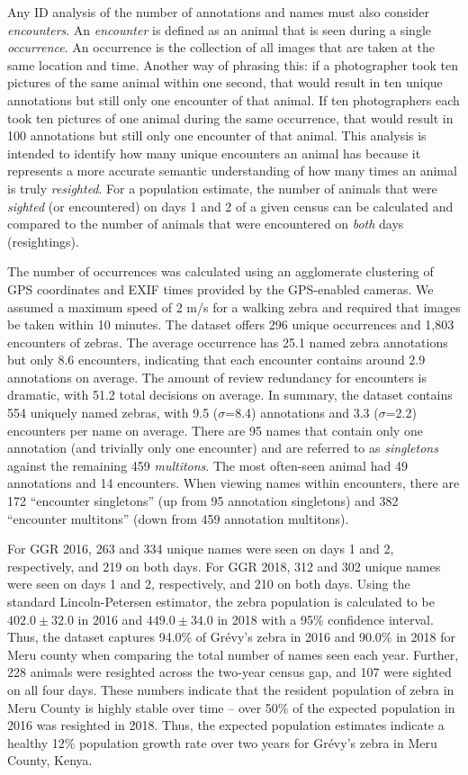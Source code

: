 Any ID analysis of the number of annotations and names must also consider \textit{encounters}.  An \textit{encounter} is defined as an animal that is seen during a single \textit{occurrence}.  An occurrence is the collection of all images that are taken at the same location and time.  Another way of phrasing this: if a photographer took ten pictures of the same animal within one second, that would result in ten unique annotations but still only one encounter of that animal.  If ten photographers each took ten pictures of one animal during the same occurrence, that would result in 100 annotations but still only one encounter of that animal.  This analysis is intended to identify how many unique encounters an animal has because it represents a more accurate semantic understanding of how many times an animal is truly \textit{resighted}.  For a population estimate, the number of animals that were \textit{sighted} (or encountered) on days 1 and 2 of a given census can be calculated and compared to the number of animals that were encountered on \textit{both} days (resightings).

The number of occurrences was calculated using an agglomerate clustering of GPS coordinates and EXIF times provided by the GPS-enabled cameras.  We assumed a maximum speed of 2 m/s for a walking zebra and required that images be taken within 10 minutes.  The dataset offers 296 unique occurrences and 1,803 encounters of zebras.  The average occurrence has 25.1 named zebra annotations but only 8.6 encounters, indicating that each encounter contains around 2.9 annotations on average.  The amount of review redundancy for encounters is dramatic, with 51.2 total decisions on average.  In summary, the dataset contains 554 uniquely named zebras, with 9.5 ($\sigma$=8.4) annotations and 3.3 ($\sigma$=2.2) encounters per name on average.  There are 95 names that contain only one annotation (and trivially only one encounter) and are referred to as \textit{singletons} against the remaining 459 \textit{multitons}.  The most often-seen animal had 49 annotations and 14 encounters.  When viewing names within encounters, there are 172 ``encounter singletons'' (up from 95 annotation singletons) and 382 ``encounter multitons'' (down from 459 annotation multitons).

For GGR 2016, 263 and 334 unique names were seen on days 1 and 2, respectively, and 219 on both days.  For GGR 2018, 312 and 302 unique names were seen on days 1 and 2, respectively, and 210 on both days.  Using the standard Lincoln-Petersen estimator, the zebra population is calculated to be $402.0\pm32.0$ in 2016 and $449.0\pm34.0$ in 2018 with a 95\% confidence interval. Thus, the dataset captures 94.0\% of Gr\'evy's zebra in 2016 and 90.0\% in 2018 for Meru county when comparing the total number of names seen each year.  Further, 228 animals were resighted across the two-year census gap, and 107 were sighted on all four days.  These numbers indicate that the resident population of zebra in Meru County is highly stable over time -- over 50\% of the expected population in 2016 was resighted in 2018. Thus, the expected population estimates indicate a healthy 12\% population growth rate over two years for Gr\'evy's zebra in Meru County, Kenya.

